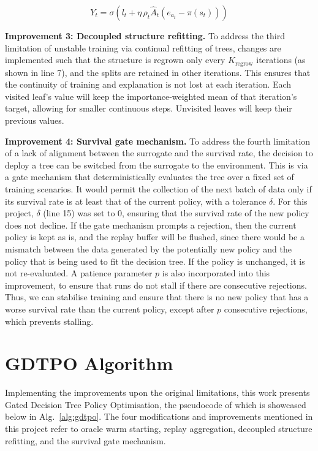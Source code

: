 \begin{equation}
Y_t = \sigma\!\left(l_t + \eta\, \rho_t \hat{A}_t \left(e_{a_t} - \pi(s_t)\right)\right)
\label{eq:targets}
\end{equation}

\textbf{Improvement 3: Decoupled structure refitting.} To address the third limitation of unstable training via continual refitting of trees, changes are implemented such that the structure is regrown only every $K_{\text{regrow}}$ iterations (as shown in line 7), and the splits are retained in other iterations. This ensures that the continuity of training and explanation is not lost at each iteration. Each visited leaf's value will keep the importance-weighted mean of that iteration's target, allowing for smaller continuous steps. Unvisited leaves will keep their previous values.

\textbf{Improvement 4: Survival gate mechanism.} To address the fourth limitation of a lack of alignment between the surrogate and the survival rate, the decision to deploy a tree can be switched from the surrogate to the environment. This is via a gate mechanism that deterministically evaluates the tree over a fixed set of training scenarios. It would permit the collection of the next batch of data only if its survival rate is at least that of the current policy, with a tolerance $\delta$. For this project, $\delta$ (line 15) was set to 0, ensuring that the survival rate of the new policy does not decline. If the gate mechanism prompts a rejection, then the current policy is kept as is, and the replay buffer will be flushed, since there would be a mismatch between the data generated by the potentially new policy and the policy that is being used to fit the decision tree. If the policy is unchanged, it is not re-evaluated. A patience parameter $p$ is also incorporated into this improvement, to ensure that runs do not stall if there are consecutive rejections. Thus, we can stabilise training and ensure that there is no new policy that has a worse survival rate than the current policy, except after $p$ consecutive rejections, which prevents stalling.

\section{GDTPO Algorithm}

Implementing the improvements upon the original limitations, this work presents Gated Decision Tree Policy Optimisation, the pseudocode of which is showcased below in Alg.~\ref{alg:gdtpo}. The four modifications and improvements mentioned in this project refer to oracle warm starting, replay aggregation, decoupled structure refitting, and the survival gate mechanism.

